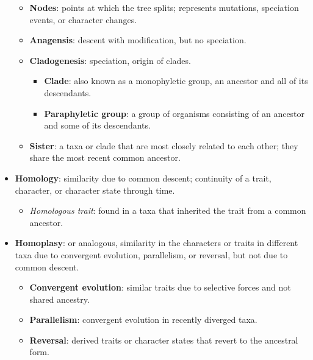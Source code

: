 \documentclass[12pt,a4paper]{article}
\begin{document}
\begin{itemize}
\begin{itemize}
\begin{itemize}
                \end{itemize}
            \item \textbf{Nodes}: points at which the tree splits; represents mutations, speciation events, or {\color{o-Sun}character changes}.
        \item {\color{false}\textbf{Anagensis}}: descent with modification, but {\color{false}no speciation}.
        \item {\color{true}\textbf{Cladogenesis}}: {\color{true}speciation}, origin of clades.
        \begin{itemize}
            \item \textbf{Clade}: also known as a {\color{o-Sun}monophyletic group}, an ancestor and {\color{o-Sun}all} of its descendants.
            \item \textbf{Paraphyletic group}: a group of organisms consisting of an ancestor and {\color{o-Sun}some} of its descendants.
        \end{itemize}
        \item \textbf{Sister}: a taxa or clade that are most closely related to each other; they {\color{o-Sun}share the most recent} common ancestor. 
    \end{itemize}
    \item \textbf{Homology}: similarity due to common descent; {\color{true}continuity} of a trait, character, or character state through time.
        \begin{itemize}
            \item \textit{Homologous trait}: found in a taxa that inherited the trait from a common ancestor.
        \end{itemize}
    \item \textbf{Homoplasy}: or analogous, similarity in the characters or traits in different taxa due to convergent evolution, parallelism, or reversal, but {\color{false}not due to common descent}.
        \begin{itemize}
            \item \textbf{Convergent evolution}: similar traits due to selective forces and {\color{false}not shared ancestry}.
            \item \textbf{Parallelism}: convergent evolution in {\color{o-Sun}recently diverged} taxa.
            \item \textbf{Reversal}: derived traits or character states that revert to the ancestral form.
        \end{itemize}
\end{itemize}
\end{document}

